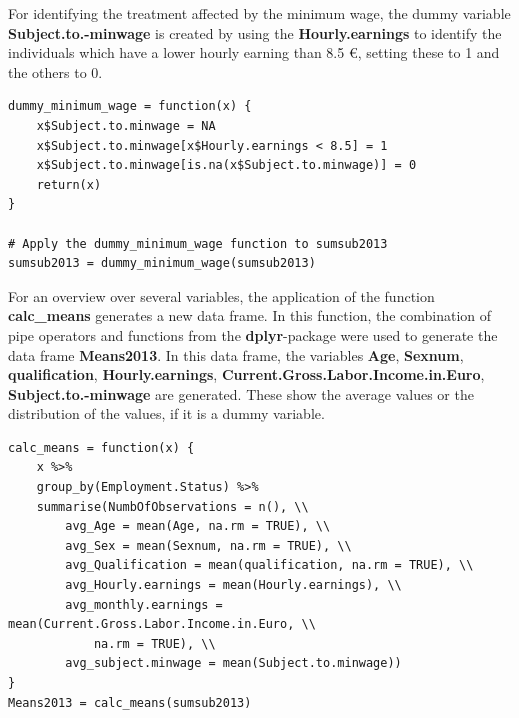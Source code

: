 \documentclass[a4paper]{article}
\begin{document}
For identifying the treatment affected by the minimum wage, the dummy variable \textbf{Subject.to.-minwage} is created by using the \textbf{Hourly.earnings} to identify the individuals which have a lower hourly earning than 8.5 \euro{}, setting these to 1 and the others to 0.
\begin{lstlisting}
dummy_minimum_wage = function(x) {
    x$Subject.to.minwage = NA
    x$Subject.to.minwage[x$Hourly.earnings < 8.5] = 1
    x$Subject.to.minwage[is.na(x$Subject.to.minwage)] = 0
    return(x)
}

# Apply the dummy_minimum_wage function to sumsub2013
sumsub2013 = dummy_minimum_wage(sumsub2013)
\end{lstlisting}
For an overview over several variables, the application of the function \textbf{calc\_means} generates a new data frame. In this function, the combination of pipe operators and functions from the \textbf{dplyr}-package were used to generate the data frame \textbf{Means2013}. In this data frame, the variables \textbf{Age}, \textbf{Sexnum}, \textbf{qualification}, \textbf{Hourly.earnings}, \textbf{Current.Gross.Labor.Income.in.Euro}, \textbf{Subject.to.-minwage} are generated. These show the average values or the distribution of the values, if it is a dummy variable. 
\begin{lstlisting}
calc_means = function(x) {
    x %>% 
    group_by(Employment.Status) %>% 
    summarise(NumbOfObservations = n(), \\
    	avg_Age = mean(Age, na.rm = TRUE), \\
        avg_Sex = mean(Sexnum, na.rm = TRUE), \\ 
        avg_Qualification = mean(qualification, na.rm = TRUE), \\
        avg_Hourly.earnings = mean(Hourly.earnings), \\
        avg_monthly.earnings = mean(Current.Gross.Labor.Income.in.Euro, \\
        	na.rm = TRUE), \\ 
        avg_subject.minwage = mean(Subject.to.minwage))
}
Means2013 = calc_means(sumsub2013)
\end{lstlisting}
\end{document}
